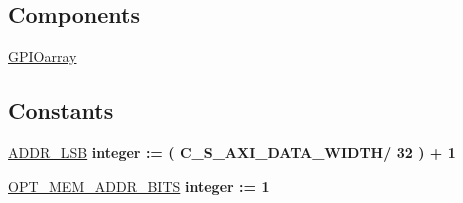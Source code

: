 \subsection*{Components}
 \begin{DoxyCompactItemize}
\item 
\hypertarget{classmy_g_p_i_o___a_x_i_1_1arch__imp_gad6a4d4ce60da2d6353c770df7ba07bd0}{\hyperlink{group__my_g_p_i_o_gad6a4d4ce60da2d6353c770df7ba07bd0}{G\+P\+I\+Oarray}  {\bfseries }  }\label{classmy_g_p_i_o___a_x_i_1_1arch__imp_gad6a4d4ce60da2d6353c770df7ba07bd0}

\end{DoxyCompactItemize}
\subsection*{Constants}
 \begin{DoxyCompactItemize}
\item 
\hypertarget{classmy_g_p_i_o___a_x_i_1_1arch__imp_ga92f00d1b43f901f1bf5684d1e79aab84}{\hyperlink{group__my_g_p_i_o_ga92f00d1b43f901f1bf5684d1e79aab84}{A\+D\+D\+R\+\_\+\+L\+S\+B} {\bfseries \textcolor{vhdlchar}{integer}\textcolor{vhdlchar}{ }\textcolor{vhdlchar}{ }\textcolor{vhdlchar}{\+:}\textcolor{vhdlchar}{=}\textcolor{vhdlchar}{ }\textcolor{vhdlchar}{(}\textcolor{vhdlchar}{ }\textcolor{vhdlchar}{ }\textcolor{vhdlchar}{ }\textcolor{vhdlchar}{ }\textcolor{vhdlchar}{C\+\_\+\+S\+\_\+\+A\+X\+I\+\_\+\+D\+A\+T\+A\+\_\+\+W\+I\+D\+T\+H}\textcolor{vhdlchar}{/}\textcolor{vhdlchar}{ } \textcolor{vhdldigit}{32} \textcolor{vhdlchar}{ }\textcolor{vhdlchar}{)}\textcolor{vhdlchar}{ }\textcolor{vhdlchar}{+}\textcolor{vhdlchar}{ } \textcolor{vhdldigit}{1} \textcolor{vhdlchar}{ }} }\label{classmy_g_p_i_o___a_x_i_1_1arch__imp_ga92f00d1b43f901f1bf5684d1e79aab84}

\item 
\hypertarget{classmy_g_p_i_o___a_x_i_1_1arch__imp_ga3482a055a516370a7032b60492b444e7}{\hyperlink{group__my_g_p_i_o_ga3482a055a516370a7032b60492b444e7}{O\+P\+T\+\_\+\+M\+E\+M\+\_\+\+A\+D\+D\+R\+\_\+\+B\+I\+T\+S} {\bfseries \textcolor{vhdlchar}{integer}\textcolor{vhdlchar}{ }\textcolor{vhdlchar}{ }\textcolor{vhdlchar}{\+:}\textcolor{vhdlchar}{=}\textcolor{vhdlchar}{ }\textcolor{vhdlchar}{ } \textcolor{vhdldigit}{1} \textcolor{vhdlchar}{ }} }\label{classmy_g_p_i_o___a_x_i_1_1arch__imp_ga3482a055a516370a7032b60492b444e7}

\end{DoxyCompactItemize}
